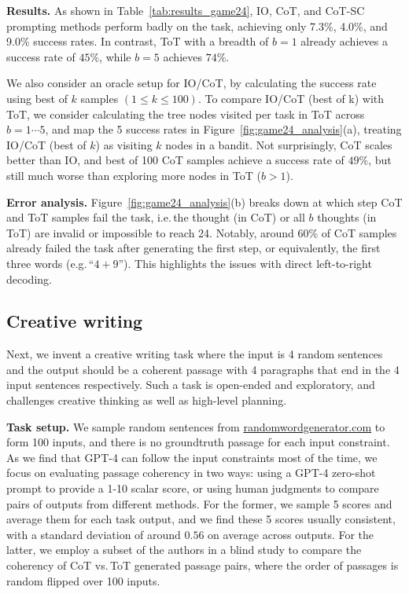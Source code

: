 \textbf{Results.} As shown in Table~\ref{tab:results_game24}, IO, CoT, and CoT-SC prompting methods perform badly on the task, achieving only 7.3\%, 4.0\%, and 9.0\% success rates. In contrast, ToT with a breadth of $b=1$ already achieves a success rate of $45\%$, while $b=5$ achieves $74\%$. 

We also consider an oracle setup for IO/CoT, by calculating the success rate using best of $k$ samples $(1\le k\le 100)$. To compare IO/CoT (best of k) with ToT, we consider calculating the tree nodes visited per task in ToT across $b=1\cdots 5$, and map the 5 success rates in Figure~\ref{fig:game24_analysis}(a), treating IO/CoT (best of $k$) as visiting $k$ nodes in a bandit. Not surprisingly, CoT scales better than IO, and best of 100 CoT samples achieve a success rate of $49\%$, but still much worse than exploring more nodes in ToT ($b>1$). 

\textbf{Error analysis.} Figure~\ref{fig:game24_analysis}(b) breaks down at which step CoT and ToT samples fail the task, i.e.\,the thought (in CoT) or all $b$ thoughts (in ToT) are invalid or impossible to reach 24. Notably, around 60\% of CoT samples already failed the task after generating the first step, or equivalently, the first three words (e.g.\,``$4 + 9$''). This highlights the issues with direct left-to-right decoding.

\subsection{Creative writing} Next, we invent a creative writing task where the input is 4 random sentences and the output should be a coherent passage with 4 paragraphs that end in the 4 input sentences respectively. Such a task is open-ended and exploratory, and challenges creative thinking as well as  high-level planning.

\textbf{Task setup.} We sample random sentences from \href{https://randomwordgenerator.com/sentence.php}{randomwordgenerator.com} to form 100 inputs, and there is no groundtruth passage for each input constraint. As we find that GPT-4 can follow the input constraints most of the time, we focus on evaluating passage coherency in two ways:  using a GPT-4 zero-shot prompt to provide a 1-10 scalar score, or using human judgments to compare pairs of outputs from different methods. For the former, we sample 5 scores and average them for each task output, and we find these 5 scores usually consistent, with a standard deviation of around $0.56$ on average across outputs. For the latter, we employ a subset of the authors in a blind study to compare the coherency of CoT vs.\,ToT generated passage pairs, where the order of passages is random flipped over 100 inputs. 

